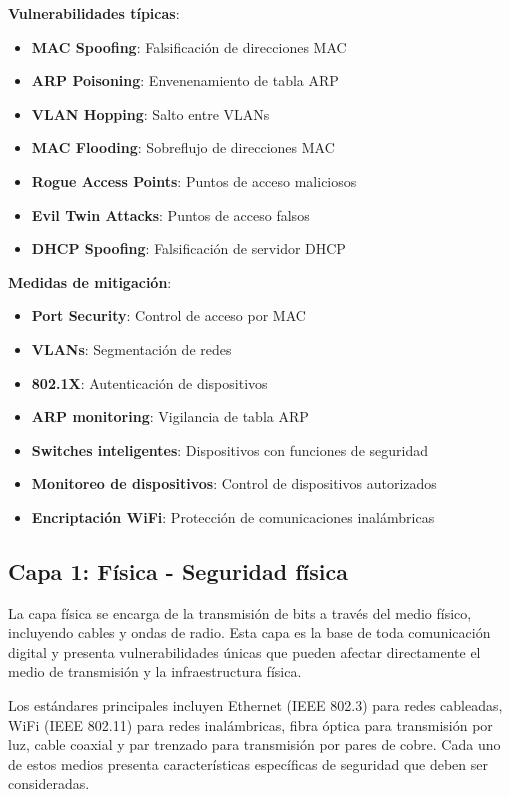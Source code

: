 \textbf{Vulnerabilidades típicas}:
\begin{itemize}
    \item \textbf{MAC Spoofing}: Falsificación de direcciones MAC
    \item \textbf{ARP Poisoning}: Envenenamiento de tabla ARP
    \item \textbf{VLAN Hopping}: Salto entre VLANs
    \item \textbf{MAC Flooding}: Sobreflujo de direcciones MAC
    \item \textbf{Rogue Access Points}: Puntos de acceso maliciosos
    \item \textbf{Evil Twin Attacks}: Puntos de acceso falsos
    \item \textbf{DHCP Spoofing}: Falsificación de servidor DHCP
\end{itemize}

\textbf{Medidas de mitigación}:
\begin{itemize}
    \item \textbf{Port Security}: Control de acceso por MAC
    \item \textbf{VLANs}: Segmentación de redes
    \item \textbf{802.1X}: Autenticación de dispositivos
    \item \textbf{ARP monitoring}: Vigilancia de tabla ARP
    \item \textbf{Switches inteligentes}: Dispositivos con funciones de seguridad
    \item \textbf{Monitoreo de dispositivos}: Control de dispositivos autorizados
    \item \textbf{Encriptación WiFi}: Protección de comunicaciones inalámbricas
\end{itemize}

\subsection{Capa 1: Física - Seguridad física}

La capa física se encarga de la transmisión de bits a través del medio físico, incluyendo cables y ondas de radio. Esta capa es la base de toda comunicación digital y presenta vulnerabilidades únicas que pueden afectar directamente el medio de transmisión y la infraestructura física.

Los estándares principales incluyen Ethernet (IEEE 802.3) para redes cableadas, WiFi (IEEE 802.11) para redes inalámbricas, fibra óptica para transmisión por luz, cable coaxial y par trenzado para transmisión por pares de cobre. Cada uno de estos medios presenta características específicas de seguridad que deben ser consideradas.

